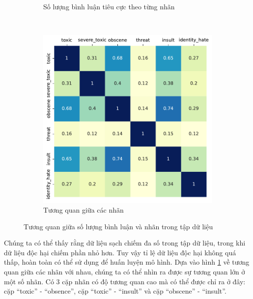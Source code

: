 \begin{figure}[htb!]
\begin{subfigure}[t]{0.7\textwidth}
        \caption{Số lượng bình luận tiêu cực theo từng nhãn}
    \end{subfigure}\\
    \begin{subfigure}{0.5\textwidth}
        \centering
        \includegraphics[width=\textwidth]{chapter_2/image/labels_corr.pdf}
        \caption{Tương quan giữa các nhãn}
    \end{subfigure}%
    \caption{Tương quan giữa số lượng bình luận và nhãn trong tập dữ liệu}
    \label{figure:number_of_records_and_labels}
\end{figure}

Chúng ta có thể thấy rằng dữ liệu sạch chiếm đa số trong tập dữ liệu, trong khi dữ liệu độc hại chiếm phần nhỏ hơn. Tuy vậy tỉ lệ dữ liệu độc hại không quá thấp, hoàn toàn có thể sử dụng để huấn luyện mô hình. Dựa vào hình \ref{figure:number_of_records_and_labels} về tương quan giữa các nhãn với nhau, chúng ta có thể nhìn ra được sự tương quan lớn ở một số nhãn. Có 3 cặp nhãn có độ tương quan cao mà có thể được chỉ ra ở đây: cặp ``toxic'' - ``obsence'', cặp ``toxic'' - ``insult'' và cặp ``obscene'' - ``insult''.

